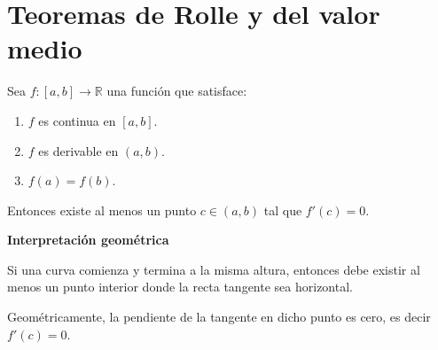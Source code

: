 \section{Teoremas de Rolle y del valor medio}
\begin{teorema}[Rolle]
Sea $f:[a,b]\to\mathbb{R}$ una función que satisface:

\begin{enumerate}
    \item $f$ es continua en $[a,b]$.
    \item $f$ es derivable en $(a,b)$.
    \item $f(a)=f(b)$.
\end{enumerate}

Entonces existe al menos un punto $c\in(a,b)$ tal que $f'(c)=0.$
\end{teorema}

\textbf{Interpretación geométrica}

Si una curva comienza y termina a la misma altura, entonces debe existir al menos un punto interior donde la recta tangente sea horizontal.

Geométricamente, la pendiente de la tangente en dicho punto es cero, es decir $f'(c)=0.$

